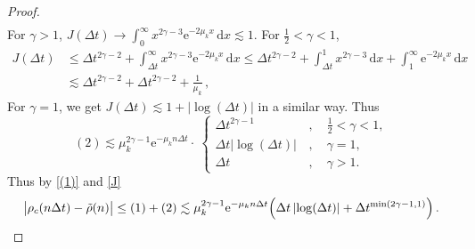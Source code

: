 \documentclass[12pt]{article} %
\newcommand{\dint}{\text{d}}
\newcommand{\abs}[1]{\left| #1 \right|}
\begin{document}
\begin{proof}
\begin{align*}
\end{align*}
%
For $\gamma >1$, 
$ J(\Delta t)\rightarrow \int_{0}^\infty x^{2 \gamma - 3} \mathrm{e}^{-2 \mu_k x} \, \dint x \lesssim 1$. For $\frac12<\gamma  < 1$,
\begin{align*}
 J(\Delta t) &\leq \Delta t^{2\gamma - 2} +  \int_{\Delta t}^{\infty} x^{2 \gamma - 3} \mathrm{e}^{-2 \mu_k x} \, \dint x \leq \Delta t^{2\gamma - 2} +\int_{\Delta t}^{1} x^{2 \gamma - 3} \, \dint x +\int_{1}^{\infty}  \mathrm{e}^{-2 \mu_k x} \, \dint x 
\\& 
\lesssim  \Delta t^{2\gamma - 2} + \Delta t^{2\gamma - 2} +\frac1{\mu_k}  \, ,
\end{align*}
For $\gamma=1$, we get 
$ J(\Delta t)\lesssim 1 + |\log(\Delta t)|$ in a similar way.  
Thus
\begin{equation} \label{J}
(2) \lesssim  \mu_k^{2 \gamma - 1} \mathrm{e}^{- \mu_k  n\Delta t } \cdot\ \begin{cases}
      \Delta t^{2 \gamma - 1} & \, , \quad \frac12<\gamma < 1 ,\\[0.2cm]
    \Delta t \abs{\log(\Delta t)}& \, , \quad \gamma = 1, \\[0.2cm]
     \Delta t & \, , \quad \gamma > 1.
\end{cases} 
\end{equation}
Thus by \eqref{(1)} and \eqref{J}
%
\begin{equation*}
\big|\rho_c(n\Delta t) - \Tilde{\rho}(n)\big| \leq (1) + (2) \lesssim \mu_k^{2 \gamma - 1} \mathrm{e}^{- \mu_k  n\Delta t } \Big(\Delta t \abs{\log(\Delta t)} + 
\Delta t^{\min(2\gamma - 1, 1)} \Big) \, . \qedhere
\end{equation*}

\end{proof}
\end{document}
